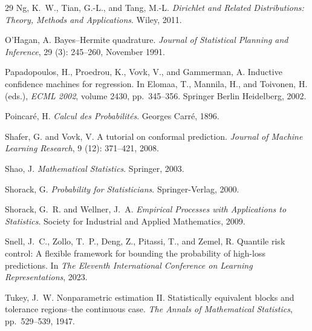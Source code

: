 \documentclass{article} %
\theoremstyle{remark}
\theoremstyle{definition}      %
\begin{document}
\begin{thebibliography}{29}
Ng, K.~W., Tian, G.-L., and Tang, M.-L.
\newblock \emph{Dirichlet and Related Distributions: Theory, Methods and
  Applications}.
\newblock Wiley, 2011.

O'Hagan, A.
\newblock Bayes--{{Hermite}} quadrature.
\newblock \emph{Journal of Statistical Planning and Inference}, 29
  (3): 245--260, November 1991.

Papadopoulos, H., Proedrou, K., Vovk, V., and Gammerman, A.
\newblock Inductive confidence machines for regression.
\newblock In Elomaa, T., Mannila, H., and Toivonen, H. (eds.), \emph{{{ECML}}
  2002}, volume 2430, pp.\  345--356. Springer Berlin Heidelberg, 2002.

Poincar{\'e}, H.
\newblock \emph{Calcul des Probabilit{\'e}s}.
\newblock Georges Carr{\'e}, 1896.

Shafer, G. and Vovk, V.
\newblock A tutorial on conformal prediction.
\newblock \emph{Journal of Machine Learning Research}, 9
  (12): 371--421, 2008.

Shao, J.
\newblock \emph{Mathematical Statistics}.
\newblock Springer, 2003.

Shorack, G.
\newblock \emph{Probability for Statisticians}.
\newblock Springer-Verlag, 2000.

Shorack, G.~R. and Wellner, J.~A.
\newblock \emph{Empirical Processes with Applications to Statistics}.
\newblock Society for Industrial and Applied Mathematics, 2009.

Snell, J.~C., Zollo, T.~P., Deng, Z., Pitassi, T., and Zemel, R.
\newblock Quantile risk control: A flexible framework for bounding the
  probability of high-loss predictions.
\newblock In \emph{The Eleventh International Conference on Learning
  Representations}, 2023.

Tukey, J.~W.
\newblock Nonparametric estimation {II}. {S}tatistically equivalent blocks and
  tolerance regions--the continuous case.
\newblock \emph{The Annals of Mathematical Statistics}, pp.\  529--539, 1947.


\end{thebibliography}
\end{document}

